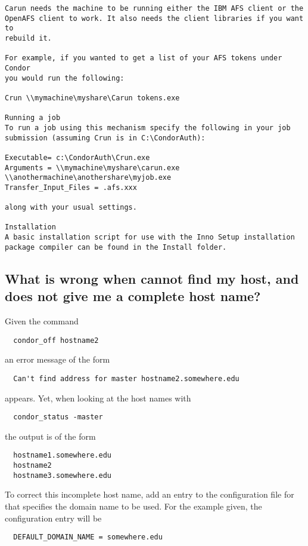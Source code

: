 \begin{verbatim}
Carun needs the machine to be running either the IBM AFS client or the 
OpenAFS client to work. It also needs the client libraries if you want to 
rebuild it.

For example, if you wanted to get a list of your AFS tokens under Condor 
you would run the following:

Crun \\mymachine\myshare\Carun tokens.exe

Running a job
To run a job using this mechanism specify the following in your job 
submission (assuming Crun is in C:\CondorAuth):

Executable= c:\CondorAuth\Crun.exe
Arguments = \\mymachine\myshare\carun.exe 
\\anothermachine\anothershare\myjob.exe
Transfer_Input_Files = .afs.xxx

along with your usual settings.

Installation
A basic installation script for use with the Inno Setup installation 
package compiler can be found in the Install folder.
\end{verbatim}

\subsection*{What is wrong when  cannot find my host, and  does not give me a complete host name?}

Given the command
\begin{verbatim}
  condor_off hostname2
\end{verbatim}
an error message of the form
\begin{verbatim}
  Can't find address for master hostname2.somewhere.edu
\end{verbatim}
appears.
Yet, when looking at the host names with
\begin{verbatim}
  condor_status -master
\end{verbatim}
the output is of the form 
\begin{verbatim}
  hostname1.somewhere.edu
  hostname2
  hostname3.somewhere.edu
\end{verbatim}

To correct this incomplete host name, add an entry to the
configuration file for
that specifies the domain name to be used.
For the example given, the configuration entry will be
\begin{verbatim}
  DEFAULT_DOMAIN_NAME = somewhere.edu
\end{verbatim}

